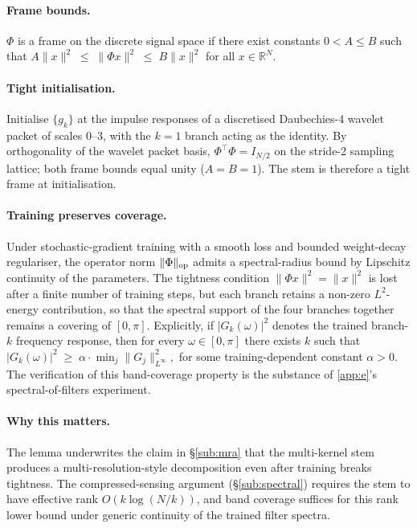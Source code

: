 \documentclass[final]{ws-ijwmip}
\begin{document}
\paragraph{Frame bounds.}
$\Phi$ is a frame on the discrete signal space if there exist constants
$0 < A \le B$ such that
$A\|x\|^2 \;\le\; \|\Phi x\|^2 \;\le\; B\|x\|^2$
for all $x\in\mathbb{R}^N$.

\paragraph{Tight initialisation.}
Initialise $\{g_k\}$ at the impulse responses of a discretised
Daubechies-4 wavelet packet of scales $0$--$3$, with the $k=1$ branch
acting as the identity. By orthogonality of the wavelet packet basis,
$\Phi^\top \Phi = I_{N/2}$ on the stride-2 sampling lattice; both frame
bounds equal unity ($A=B=1$). The stem is therefore a tight frame at
initialisation.

\paragraph{Training preserves coverage.}
Under stochastic-gradient training with a smooth loss and bounded
weight-decay regulariser, the operator norm $\|\Phi\|_{\rm op}$ admits a
spectral-radius bound by Lipschitz continuity of the parameters. The
tightness condition $\|\Phi x\|^2 = \|x\|^2$ is lost after a finite
number of training steps, but each branch retains a non-zero
$L^2$-energy contribution, so that the spectral support of the four
branches together remains a covering of $[0, \pi]$. Explicitly, if
$|G_k(\omega)|^2$ denotes the trained branch-$k$ frequency response,
then for every $\omega\in[0,\pi]$ there exists $k$ such that
$|G_k(\omega)|^2 \;\ge\; \alpha\cdot \min_j \|G_j\|_{L^\infty}^2,$
for some training-dependent constant $\alpha>0$. The verification of
this band-coverage property is the substance of \ref{app:e}'s
spectral-of-filters experiment.

\paragraph{Why this matters.}
The lemma underwrites the claim in \S\ref{sub:mra} that the multi-kernel
stem produces a multi-resolution-style decomposition even after training
breaks tightness. The compressed-sensing argument
(\S\ref{sub:spectral}) requires the stem to have effective rank
$O(k\log(N/k))$, and band coverage suffices for this rank lower bound
under generic continuity of the trained filter spectra.
\end{document}
